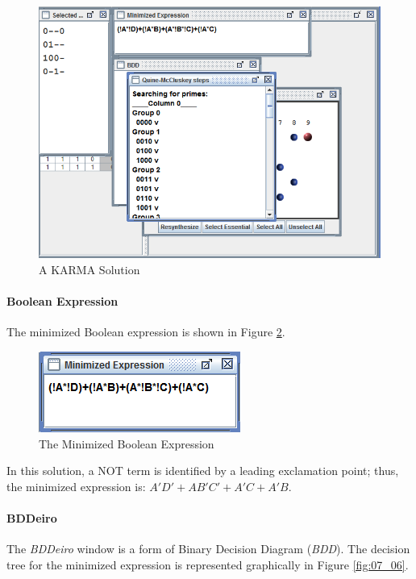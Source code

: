 \begin{figure}[H]
	\centering
	\includegraphics[width=\maxwidth{.95\linewidth}]{gfx/07_04}
	\caption{A KARMA Solution}
	\label{fig:07_04}
\end{figure}

\paragraph{Boolean Expression}

The minimized Boolean expression is shown in Figure \ref{fig:07_05}.

\begin{figure}[H]
	\centering
	\includegraphics[width=\maxwidth{.95\linewidth}]{gfx/07_05}
	\caption{The Minimized Boolean Expression}
	\label{fig:07_05}
\end{figure}

In this solution, a NOT term is identified by a leading exclamation point; thus, the minimized expression is: $ A'D' + AB'C' + A'C + A'B $.

\paragraph{BDDeiro}

The \textit{BDDeiro} window is a form of Binary Decision Diagram (\textit{BDD}). The decision tree for the minimized expression is represented graphically in Figure \ref{fig:07_06}.

